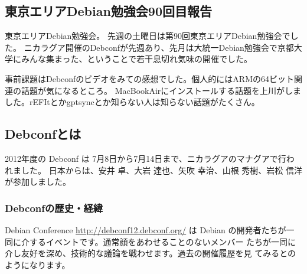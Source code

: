 \documentclass[mingoth,a4paper]{jsarticle}
\begin{document}
\subsection{東京エリアDebian勉強会90回目報告}


東京エリアDebian勉強会。
先週の土曜日は第90回東京エリアDebian勉強会でした。
ニカラグア開催のDebconfが先週あり、先月は大統一Debian勉強会で京都大学にみんな集まった、ということで若干息切れ気味の開催でした。

事前課題はDebconfのビデオをみての感想でした。個人的にはARMの64ビット関連の話題が気になるところ。
MacBookAirにインストールする話題を上川がしました。rEFItとかgptsyncとか知らない人は知らない話題がたくさん。


\label{sec:debconfreportsummary}

\subsection{Debconfとは}

2012年度の Debconf は 7月8日から7月14日まで、ニカラグアのマナグアで行われました。
日本からは、安井 卓、大岩 達也、矢吹 幸治、山根 秀樹、岩松 信洋が参加しました。

\subsubsection{Debconfの歴史・経緯}

Debian Conference \url{http://debconf12.debconf.org/} は Debian 
の開発者たちが一同に介するイベントです。通常顔をあわせることのないメンバー
たちが一同に介し友好を深め、技術的な議論を戦わせます。過去の開催履歴を見
てみるとのようになります。
\end{document}
